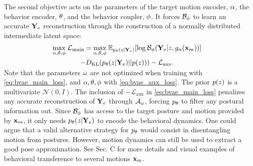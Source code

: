\documentclass[10pt,twocolumn,letterpaper]{article}
\begin{document}
The second objective acts on the parameters of the target motion encoder, $\alpha$, the behavior encoder, $\theta$, and the behavior coupler, $\phi$. It forces $\mathcal{B}_{\phi}$ to learn an accurate $\mathbf{Y}_{e}$ reconstruction through the construction of a normally distributed intermediate latent space:
\vspace{-0.2cm}
\begin{equation}
\label{eq:bvae_main_loss}
\begin{gathered}
    \underset{\bvaeXmotionEncParams, \bvaeEncParams, \bvaeDecParams}{\max}\; \mathcal{L}_{\text{main}} = \underset{\bvaeXmotionEncParams, \bvaeEncParams, \bvaeDecParams}{\max}\; \mathbb{E}_{\bvaeEnc(\latcode|\extPred)} [\log \bvaeDec(\extPred|\latcode, \bvaeXmotionEnc(\xmotion))] \\
    - D_{\text{KL}}(\bvaeEnc(\latcode | \extPred) || p(\latcode))) - \mathcal{L}_{\text{aux}}.
    \vspace{-0.2cm}
\end{gathered}
\end{equation}
Note that the parameters $\omega$ are not optimized when training with \autoref{eq:bvae_main_loss}, and $\alpha, \theta, \phi$ with \autoref{eq:bvae_aux_loss}. The prior $p(z)$ is a multivariate $\mathcal{N}(0, I)$.
The inclusion of $-\mathcal{L}_{\text{aux}}$ in \autoref{eq:bvae_main_loss} penalizes any accurate reconstruction of $\mathbf{Y}_{e}$ through $\mathcal{A}_{\omega}$, forcing $p_{\theta}$ to filter any postural information out. Since $\mathcal{B}_{\phi}$ has access to the target posture and motion provided by $\mathbf{x}_{m}$, it only needs $p_{\theta} (z|\mathbf{Y}_{e})$ to encode the behavioral dynamics. One could argue that a valid alternative strategy for $p_{\theta}$ would consist in disentangling motion from postures. However, motion dynamics can still be used to extract a good pose approximation.
See \supp{} Sec. C for more details and visual examples of behavioral transference to several motions $\mathbf{x}_{m}$.
\end{document}

